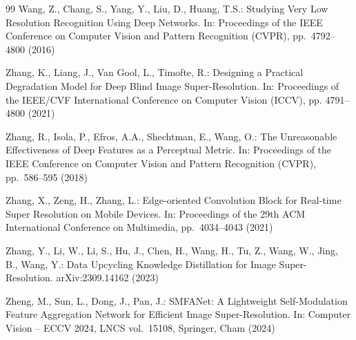 \documentclass[11pt]{article}
\begin{document}
\begin{thebibliography}{99}
Wang, Z., Chang, S., Yang, Y., Liu, D., Huang, T.S.:
Studying Very Low Resolution Recognition Using Deep Networks.
In: Proceedings of the IEEE Conference on Computer Vision and Pattern Recognition (CVPR), pp.\ 4792--4800 (2016)

Zhang, K., Liang, J., Van Gool, L., Timofte, R.:
Designing a Practical Degradation Model for Deep Blind Image Super-Resolution.
In: Proceedings of the IEEE/CVF International Conference on Computer Vision (ICCV), pp. 4791--4800 (2021)

Zhang, R., Isola, P., Efros, A.A., Shechtman, E., Wang, O.:
The Unreasonable Effectiveness of Deep Features as a Perceptual Metric.
In: Proceedings of the IEEE Conference on Computer Vision and Pattern Recognition (CVPR), pp.\ 586--595 (2018)

Zhang, X., Zeng, H., Zhang, L.:
Edge-oriented Convolution Block for Real-time Super Resolution on Mobile Devices.
In: Proceedings of the 29th ACM International Conference on Multimedia, pp.\ 4034--4043 (2021)

Zhang, Y., Li, W., Li, S., Hu, J., Chen, H., Wang, H., Tu, Z., Wang, W., Jing, B., Wang, Y.:
Data Upcycling Knowledge Distillation for Image Super-Resolution.
arXiv:2309.14162 (2023)

Zheng, M., Sun, L., Dong, J., Pan, J.:
SMFANet: A Lightweight Self-Modulation Feature Aggregation Network for Efficient Image Super-Resolution.
In: Computer Vision -- ECCV 2024, LNCS vol.\ 15108, Springer, Cham (2024)

\end{thebibliography}
\end{document}
